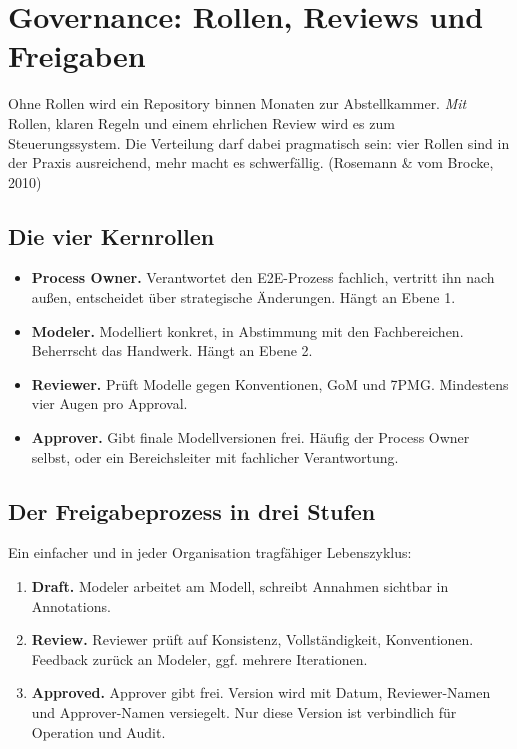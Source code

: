 \documentclass[11pt,a4paper,oneside]{article}
\newcommand{\fachbegriff}[1]{\textbf{#1}}
\newcommand{\quelle}[1]{{\footnotesize\color{lpGray}(#1)}}
\begin{document}
\section{Governance: Rollen, Reviews und Freigaben}

Ohne Rollen wird ein Repository binnen Monaten zur Abstellkammer. \emph{Mit} Rollen, klaren Regeln und einem ehrlichen Review wird es zum Steuerungssystem. Die Verteilung darf dabei pragmatisch sein: vier Rollen sind in der Praxis ausreichend, mehr macht es schwerfällig. \quelle{Rosemann \& vom Brocke, 2010}

\subsection{Die vier Kernrollen}

\begin{itemize}
  \item \fachbegriff{Process Owner.} Verantwortet den E2E-Prozess fachlich, vertritt ihn nach außen, entscheidet über strategische Änderungen. Hängt an Ebene 1.
  \item \fachbegriff{Modeler.} Modelliert konkret, in Abstimmung mit den Fachbereichen. Beherrscht das Handwerk. Hängt an Ebene 2.
  \item \fachbegriff{Reviewer.} Prüft Modelle gegen Konventionen, GoM und 7PMG. Mindestens vier Augen pro Approval.
  \item \fachbegriff{Approver.} Gibt finale Modellversionen frei. Häufig der Process Owner selbst, oder ein Bereichsleiter mit fachlicher Verantwortung.
\end{itemize}

\subsection{Der Freigabeprozess in drei Stufen}

Ein einfacher und in jeder Organisation tragfähiger Lebenszyklus:

\begin{enumerate}
  \item \fachbegriff{Draft.} Modeler arbeitet am Modell, schreibt Annahmen sichtbar in Annotations.
  \item \fachbegriff{Review.} Reviewer prüft auf Konsistenz, Vollständigkeit, Konventionen. Feedback zurück an Modeler, ggf. mehrere Iterationen.
  \item \fachbegriff{Approved.} Approver gibt frei. Version wird mit Datum, Reviewer-Namen und Approver-Namen versiegelt. Nur diese Version ist verbindlich für Operation und Audit.
\end{enumerate}
\end{document}
